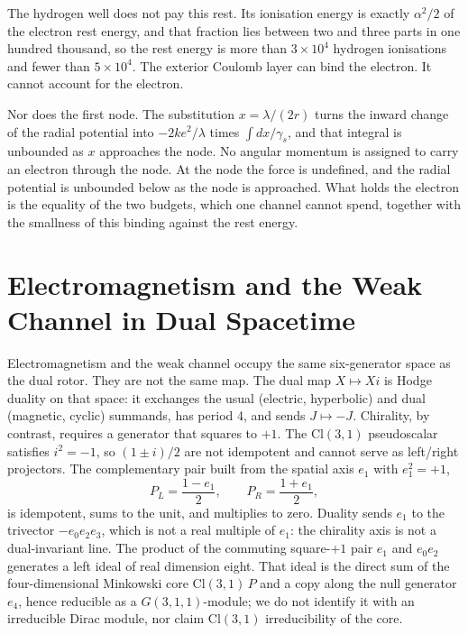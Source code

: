 \documentclass[a4paper]{article}
\begin{document}
The hydrogen well does not pay this rest. Its ionisation energy is exactly \(\alpha^2/2\) of the electron rest energy, and that fraction lies between two and three parts in one hundred thousand, so the rest energy is more than \(3\times 10^4\) hydrogen ionisations and fewer than \(5\times 10^4\). The exterior Coulomb layer can bind the electron. It cannot account for the electron.

Nor does the first node. The substitution \(x=\lambda/(2r)\) turns the inward change of the radial potential into \(-2ke^2/\lambda\) times \(\int dx/\gamma_s\), and that integral is unbounded as \(x\) approaches the node. No angular momentum is assigned to carry an electron through the node. At the node the force is undefined, and the radial potential is unbounded below as the node is approached. What holds the electron is the equality of the two budgets, which one channel cannot spend, together with the smallness of this binding against the rest energy.

\section{Electromagnetism and the Weak Channel in Dual Spacetime}
\label{sec:unification}

Electromagnetism and the weak channel occupy the same six-generator space as the dual rotor. They are not the same map. The dual map $X\mapsto Xi$ is Hodge duality on that space: it exchanges the usual (electric, hyperbolic) and dual (magnetic, cyclic) summands, has period 4, and sends $J\mapsto -J$. Chirality, by contrast, requires a generator that squares to $+1$. The $\mathrm{Cl}(3,1)$ pseudoscalar satisfies $i^2=-1$, so $(1\pm i)/2$ are not idempotent and cannot serve as left/right projectors. The complementary pair built from the spatial axis $e_1$ with $e_1^2=+1$,
\[
P_L = \frac{1 - e_1}{2},\qquad P_R = \frac{1 + e_1}{2},
\]
is idempotent, sums to the unit, and multiplies to zero. Duality sends $e_1$ to the trivector $-e_0 e_2 e_3$, which is not a real multiple of $e_1$: the chirality axis is not a dual-invariant line. The product of the commuting square-$+1$ pair $e_1$ and $e_0e_2$ generates a left ideal of real dimension eight. That ideal is the direct sum of the four-dimensional Minkowski core $\mathrm{Cl}(3,1)\,P$ and a copy along the null generator $e_4$, hence reducible as a $G(3,1,1)$-module; we do not identify it with an irreducible Dirac module, nor claim $\mathrm{Cl}(3,1)$ irreducibility of the core.
\end{document}
